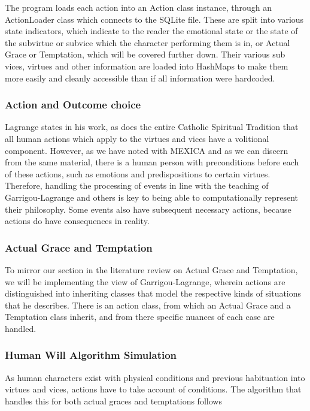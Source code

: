 \documentclass[11pt]{article}
\begin{document}
The program loads each action into an Action class instance, through an ActionLoader class which connects to the SQLite file. These are split into various state indicators, which indicate to the reader the emotional state or the state of the subvirtue or subvice which the character performing them is in, or Actual Grace or Temptation, which will be covered further down. Their various sub vices, virtues and other information are loaded into HashMaps to make them more easily and cleanly accessible than if all information were hardcoded.\\ 

\subsubsection{Action and Outcome choice}
Lagrange states in his work, as does the entire Catholic Spiritual Tradition that all human actions which apply to the virtues and vices have a volitional component. However, as we have noted with MEXICA and as we can discern from the same material, there is a human person with preconditions before each of these actions, such as emotions and predispositions to certain virtues. Therefore, handling the processing of events in line with the teaching of Garrigou-Lagrange and others is key to being able to computationally represent their philosophy. Some events also have subsequent necessary actions, because actions do have consequences in reality.\\

\subsubsection{Actual Grace and Temptation}
To mirror our section in the literature review on Actual Grace and Temptation, we will be implementing the view of Garrigou-Lagrange, wherein actions are distinguished into inheriting classes that model the respective kinds of situations that he describes. There is an action class, from which an Actual Grace and a Temptation class inherit, and from there specific nuances of each case are handled.\\

\subsubsection{Human Will Algorithm Simulation}
As human characters exist with physical conditions and previous habituation into virtues and vices, actions have to take account of conditions. The algorithm that handles this for both actual graces and temptations follows\:
\end{document}
